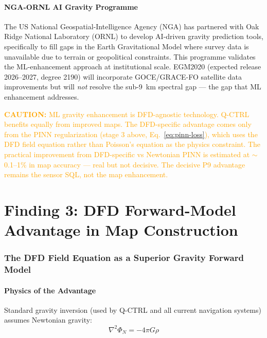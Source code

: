 \documentclass[11pt]{article}
\theoremstyle{definition}
\theoremstyle{remark}
\newcommand{\caution}[1]{\textcolor{orange}{\textbf{CAUTION:} #1}}
\begin{document}
\subsection{NGA-ORNL AI Gravity Programme}

The US National Geospatial-Intelligence Agency (NGA) has partnered with
Oak Ridge National Laboratory (ORNL) to develop AI-driven gravity
prediction tools, specifically to fill gaps in the Earth Gravitational
Model where survey data is unavailable due to terrain or geopolitical
constraints. This programme validates the ML-enhancement approach at
institutional scale. EGM2020 (expected release 2026--2027, degree 2190)
will incorporate GOCE/GRACE-FO satellite data improvements but will
\emph{not} resolve the sub-9~km spectral gap --- the gap that ML
enhancement addresses.

\caution{ML gravity enhancement is DFD-agnostic technology. Q-CTRL
benefits equally from improved maps. The DFD-specific advantage comes
only from the PINN regularization (stage 3 above, Eq.~\ref{eq:pinn-loss}),
which uses the DFD field equation rather than Poisson's equation as the
physics constraint. The practical improvement from DFD-specific vs
Newtonian PINN is estimated at $\sim$0.1--1\% in map accuracy --- real
but not decisive. The decisive P9 advantage remains the sensor SQL, not
the map enhancement.}

\part{Finding 3: DFD Forward-Model Advantage in Map Construction}
\label{part:dfd-forward}

\section{The DFD Field Equation as a Superior Gravity Forward Model}
\label{sec:dfd-forward}

\subsection{Physics of the Advantage}

Standard gravity inversion (used by Q-CTRL and all current navigation
systems) assumes Newtonian gravity:
\begin{equation}
\nabla^2\Phi_N = -4\pi G\rho
\label{eq:newton-poisson}
\end{equation}
\end{document}
